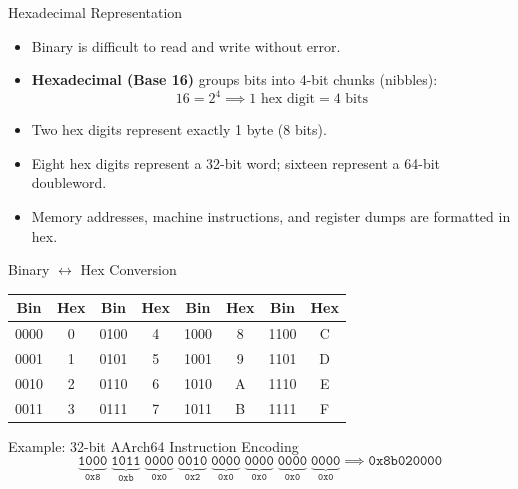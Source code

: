 \documentclass[aspectratio=169,11pt]{beamer}
\newcommand{\key}[1]{\textbf{#1}}
\newcommand{\bits}[1]{\texttt{#1}}
\newcommand{\hex}[1]{\texttt{0x#1}}
\begin{document}
\begin{frame}{Hexadecimal Representation}

\begin{itemize}
  \item Binary is difficult to read and write without error.
  \item \key{Hexadecimal (Base 16)} groups bits into 4-bit chunks (nibbles):
  $$16 = 2^4 \implies 1 \text{ hex digit} = 4 \text{ bits}$$
  \item Two hex digits represent exactly 1 byte (8 bits).
  \item Eight hex digits represent a 32-bit word; sixteen represent a 64-bit doubleword.
  \item Memory addresses, machine instructions, and register dumps are formatted in hex.
\end{itemize}

\end{frame}


\begin{frame}{Binary $\leftrightarrow$ Hex Conversion}

\begin{center}
\small
\begin{tabular}{cc@{\qquad}cc@{\qquad}cc@{\qquad}cc}
\toprule
\textbf{Bin} & \textbf{Hex} & \textbf{Bin} & \textbf{Hex} & \textbf{Bin} & \textbf{Hex} & \textbf{Bin} & \textbf{Hex} \\
\midrule
0000 & 0 & 0100 & 4 & 1000 & 8 & 1100 & C \\
0001 & 1 & 0101 & 5 & 1001 & 9 & 1101 & D \\
0010 & 2 & 0110 & 6 & 1010 & A & 1110 & E \\
0011 & 3 & 0111 & 7 & 1011 & B & 1111 & F \\
\bottomrule
\end{tabular}
\end{center}

\begin{block}{Example: 32-bit AArch64 Instruction Encoding}
$$\underbrace{\bits{1000}}_{\hex{8}}\; \underbrace{\bits{1011}}_{\hex{b}}\; \underbrace{\bits{0000}}_{\hex{0}}\; \underbrace{\bits{0010}}_{\hex{2}}\; \underbrace{\bits{0000}}_{\hex{0}}\; \underbrace{\bits{0000}}_{\hex{0}}\; \underbrace{\bits{0000}}_{\hex{0}}\; \underbrace{\bits{0000}}_{\hex{0}} \implies \hex{8b020000}$$
\end{block}

\end{frame}
\end{document}
